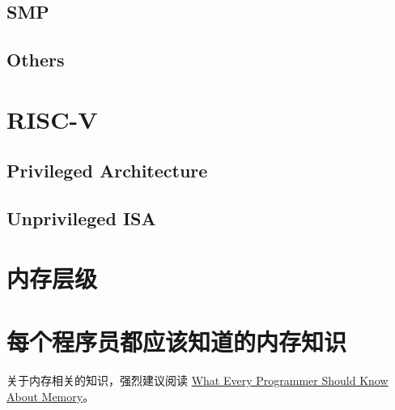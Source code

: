 \subsection{SMP}

\subsection{Others}

\section{RISC-V}

\subsection{Privileged Architecture}

\subsection{Unprivileged ISA}

\section{内存层级}

\section{每个程序员都应该知道的内存知识}

关于内存相关的知识，强烈建议阅读
\href{https://people.freebsd.org/~lstewart/articles/cpumemory.pdf}{What Every Programmer Should Know About Memory}。


